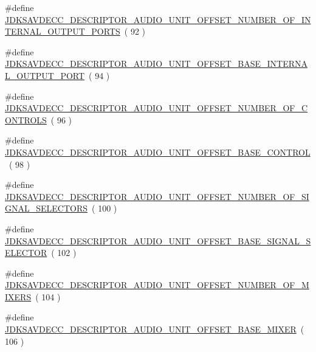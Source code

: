 \begin{DoxyCompactItemize}
\item 
\#define \hyperlink{group__descriptor__audio_ga805d1372d6896bc1a4da90dfce2bd3d7}{J\+D\+K\+S\+A\+V\+D\+E\+C\+C\+\_\+\+D\+E\+S\+C\+R\+I\+P\+T\+O\+R\+\_\+\+A\+U\+D\+I\+O\+\_\+\+U\+N\+I\+T\+\_\+\+O\+F\+F\+S\+E\+T\+\_\+\+N\+U\+M\+B\+E\+R\+\_\+\+O\+F\+\_\+\+I\+N\+T\+E\+R\+N\+A\+L\+\_\+\+O\+U\+T\+P\+U\+T\+\_\+\+P\+O\+R\+TS}~( 92 )
\item 
\#define \hyperlink{group__descriptor__audio_ga0fe9cd5dea1ee3b058a10c721bd37141}{J\+D\+K\+S\+A\+V\+D\+E\+C\+C\+\_\+\+D\+E\+S\+C\+R\+I\+P\+T\+O\+R\+\_\+\+A\+U\+D\+I\+O\+\_\+\+U\+N\+I\+T\+\_\+\+O\+F\+F\+S\+E\+T\+\_\+\+B\+A\+S\+E\+\_\+\+I\+N\+T\+E\+R\+N\+A\+L\+\_\+\+O\+U\+T\+P\+U\+T\+\_\+\+P\+O\+RT}~( 94 )
\item 
\#define \hyperlink{group__descriptor__audio_ga47bdbe74465033c893ebc2431b1b62fe}{J\+D\+K\+S\+A\+V\+D\+E\+C\+C\+\_\+\+D\+E\+S\+C\+R\+I\+P\+T\+O\+R\+\_\+\+A\+U\+D\+I\+O\+\_\+\+U\+N\+I\+T\+\_\+\+O\+F\+F\+S\+E\+T\+\_\+\+N\+U\+M\+B\+E\+R\+\_\+\+O\+F\+\_\+\+C\+O\+N\+T\+R\+O\+LS}~( 96 )
\item 
\#define \hyperlink{group__descriptor__audio_gac21d759dec278f25f57861706c3a7973}{J\+D\+K\+S\+A\+V\+D\+E\+C\+C\+\_\+\+D\+E\+S\+C\+R\+I\+P\+T\+O\+R\+\_\+\+A\+U\+D\+I\+O\+\_\+\+U\+N\+I\+T\+\_\+\+O\+F\+F\+S\+E\+T\+\_\+\+B\+A\+S\+E\+\_\+\+C\+O\+N\+T\+R\+OL}~( 98 )
\item 
\#define \hyperlink{group__descriptor__audio_ga4e2e40eed850c29e5f0fd72d69bee2c8}{J\+D\+K\+S\+A\+V\+D\+E\+C\+C\+\_\+\+D\+E\+S\+C\+R\+I\+P\+T\+O\+R\+\_\+\+A\+U\+D\+I\+O\+\_\+\+U\+N\+I\+T\+\_\+\+O\+F\+F\+S\+E\+T\+\_\+\+N\+U\+M\+B\+E\+R\+\_\+\+O\+F\+\_\+\+S\+I\+G\+N\+A\+L\+\_\+\+S\+E\+L\+E\+C\+T\+O\+RS}~( 100 )
\item 
\#define \hyperlink{group__descriptor__audio_ga83b9dd6047c4a1360160ec7109c2ed1a}{J\+D\+K\+S\+A\+V\+D\+E\+C\+C\+\_\+\+D\+E\+S\+C\+R\+I\+P\+T\+O\+R\+\_\+\+A\+U\+D\+I\+O\+\_\+\+U\+N\+I\+T\+\_\+\+O\+F\+F\+S\+E\+T\+\_\+\+B\+A\+S\+E\+\_\+\+S\+I\+G\+N\+A\+L\+\_\+\+S\+E\+L\+E\+C\+T\+OR}~( 102 )
\item 
\#define \hyperlink{group__descriptor__audio_gab86755b80b68e45d1995ab9a973034e5}{J\+D\+K\+S\+A\+V\+D\+E\+C\+C\+\_\+\+D\+E\+S\+C\+R\+I\+P\+T\+O\+R\+\_\+\+A\+U\+D\+I\+O\+\_\+\+U\+N\+I\+T\+\_\+\+O\+F\+F\+S\+E\+T\+\_\+\+N\+U\+M\+B\+E\+R\+\_\+\+O\+F\+\_\+\+M\+I\+X\+E\+RS}~( 104 )
\item 
\#define \hyperlink{group__descriptor__audio_ga690539490bc3b354a3dc5016b1735681}{J\+D\+K\+S\+A\+V\+D\+E\+C\+C\+\_\+\+D\+E\+S\+C\+R\+I\+P\+T\+O\+R\+\_\+\+A\+U\+D\+I\+O\+\_\+\+U\+N\+I\+T\+\_\+\+O\+F\+F\+S\+E\+T\+\_\+\+B\+A\+S\+E\+\_\+\+M\+I\+X\+ER}~( 106 )

\end{DoxyCompactItemize}
